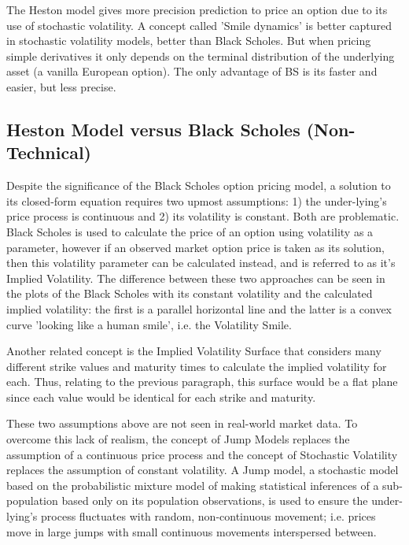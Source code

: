 \documentclass{article}
\begin{document}
The Heston model gives more precision prediction to price an option due to its use of stochastic volatility. A concept called 'Smile dynamics' is better captured in stochastic volatility models, better than Black Scholes. But when pricing simple derivatives it only depends on the terminal distribution of the underlying asset (a vanilla European option). The only advantage of BS is its faster and easier, but less precise.
\newpage
\subsection{Heston Model versus Black Scholes (Non-Technical)} 

Despite the significance of the Black Scholes option pricing model, a solution to its closed-form equation requires two upmost assumptions: 1) the under-lying's price process is continuous and 2) its volatility is constant.  Both are problematic.  Black Scholes is used to calculate the price of an option using volatility as a parameter, however if an observed market option price is taken as its solution, then this volatility parameter can be calculated instead, and is referred to as it's Implied Volatility. The difference between these two approaches can be seen in the plots of the Black Scholes with its constant volatility and the calculated implied volatility: the first is a parallel horizontal line and the latter is a convex curve 'looking like a human smile', i.e. the Volatility Smile.
\cite{galiotos}

Another related concept is the Implied Volatility Surface that considers many different strike values and maturity times to calculate the implied volatility for each. Thus, relating to the previous paragraph, this surface would be a flat plane since each value would be identical for each strike and maturity.
\cite{wqu630notes}

These two assumptions above are not seen in real-world market data.  To overcome this lack of realism, the concept of Jump Models replaces the assumption of a continuous price process and the concept of Stochastic Volatility replaces the assumption of constant volatility.  A Jump model, a stochastic model based on the probabilistic mixture model of making statistical inferences of a sub-population based only on its population observations, is used to ensure the under-lying's process fluctuates with random, non-continuous movement; i.e. prices move in large jumps with small continuous movements interspersed between.
\cite{jumpD}
\end{document}
